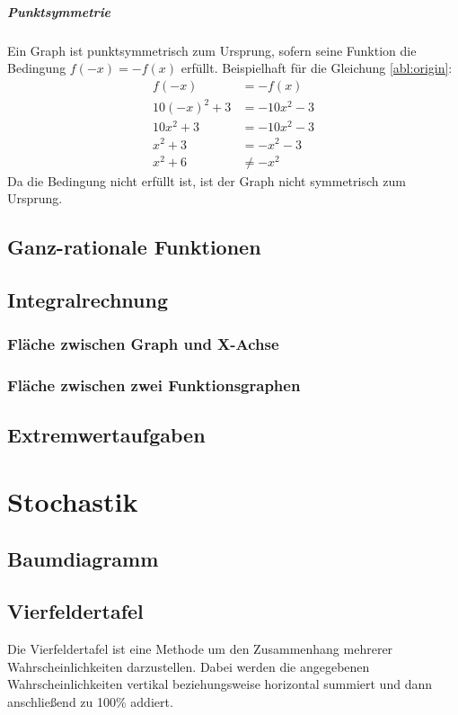\documentclass[a4paper]{article}
\begin{document}
				\subparagraph{Punktsymmetrie}
					Ein Graph ist punktsymmetrisch zum Ursprung, sofern seine Funktion die Bedingung $f(-x) = -f(x)$ erfüllt. Beispielhaft für die Gleichung \ref{abl:origin}:
					\begin{equation}
						\begin{split}
							f(-x) &= -f(x)\\
							10(-x)^2+3 &= -10x^2-3\\
							10x^2+3 &= -10x^2-3\\
							x^2+3 &= -x^2-3\\
							x^2+6 &\neq -x^2
						\end{split}
					\end{equation}
					Da die Bedingung nicht erfüllt ist, ist der Graph nicht symmetrisch zum Ursprung.
		\subsection{Ganz-rationale Funktionen}
		\subsection{Integralrechnung}
			\subsubsection{Fläche zwischen Graph und X-Achse}
			\subsubsection{Fläche zwischen zwei Funktionsgraphen}
		\subsection{Extremwertaufgaben}

	\section{Stochastik}
		\subsection{Baumdiagramm}
		\subsection{Vierfeldertafel}
			Die Vierfeldertafel ist eine Methode um den Zusammenhang mehrerer Wahrscheinlichkeiten darzustellen. Dabei werden die angegebenen Wahrscheinlichkeiten vertikal beziehungsweise horizontal summiert und dann anschließend zu 100\% addiert.
			
\end{document}
